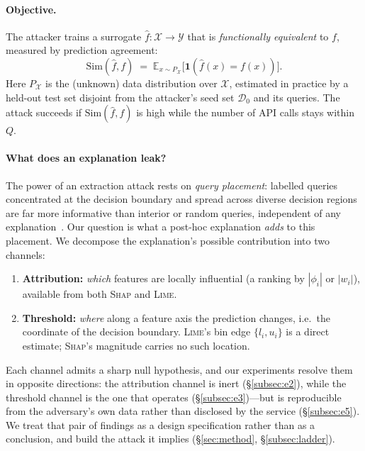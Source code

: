 \documentclass[sigconf,anonymous,review]{acmart}
\begin{document}
\paragraph{Objective.}
The attacker trains a surrogate $\hat{f} : \mathcal{X} \to \mathcal{Y}$ that is
\emph{functionally equivalent} to $f$, measured by prediction agreement:
\begin{equation}
    \mathrm{Sim}(\hat{f}, f) \;=\; \mathbb{E}_{x \sim P_{\mathcal{X}}}
    \bigl[\mathbf{1}(\hat{f}(x) = f(x))\bigr].
    \label{eq:sim}
\end{equation}
Here $P_{\mathcal{X}}$ is the (unknown) data distribution over $\mathcal{X}$,
estimated in practice by a held-out test set disjoint from the attacker's seed set
$\mathcal{D}_{0}$ and its queries.
The attack succeeds if $\mathrm{Sim}(\hat{f}, f)$ is high while the number of API
calls stays within $Q$. 

\paragraph{What does an explanation leak?}
The power of an extraction attack rests on \emph{query placement}: labelled queries
concentrated at the decision boundary and spread across diverse decision regions are far
more informative than interior or random queries, independent of any
explanation~\cite{pal2020activethief}. Our question is what a post-hoc explanation
\emph{adds} to this placement. We decompose the explanation's possible contribution into
two channels:
\begin{enumerate}
  \item \textbf{Attribution:} \emph{which} features are locally influential
  (a ranking by $|\phi_i|$ or $|w_i|$), available from both \textsc{Shap} and
  \textsc{Lime}.
  \item \textbf{Threshold:} \emph{where} along a feature axis the prediction
  changes, i.e.\ the coordinate of the decision boundary. \textsc{Lime}'s bin edge
  $\{l_i, u_i\}$ is a direct estimate; \textsc{Shap}'s magnitude carries no such
  location.
\end{enumerate}
Each channel admits a sharp null hypothesis, and our experiments resolve them in opposite directions:
the attribution channel is inert (\S\ref{subsec:e2}), while the threshold channel is the one that
operates (\S\ref{subsec:e3})---but is reproducible from the adversary's own data rather than disclosed
by the service (\S\ref{subsec:e5}). We treat that pair of findings as a design specification rather
than as a conclusion, and build the attack it implies (\S\ref{sec:method}, \S\ref{subsec:ladder}).
\end{document}
